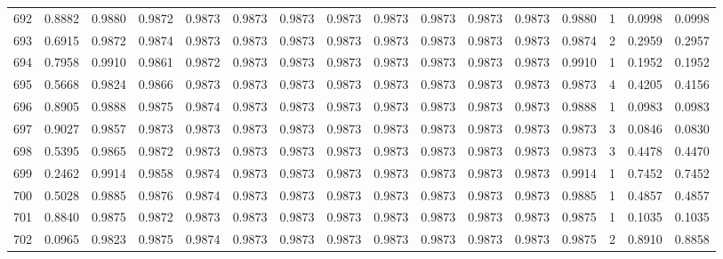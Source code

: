 \begin{tabular}{lrrrrrrrrrrrrrrr}
692 &      0.8882 &  0.9880 &  0.9872 &  0.9873 &  0.9873 &  0.9873 &  0.9873 &  0.9873 &  0.9873 &  0.9873 &   0.9873 &     0.9880 &      1 &                    0.0998 &                     0.0998 \\
693 &      0.6915 &  0.9872 &  0.9874 &  0.9873 &  0.9873 &  0.9873 &  0.9873 &  0.9873 &  0.9873 &  0.9873 &   0.9873 &     0.9874 &      2 &                    0.2959 &                     0.2957 \\
694 &      0.7958 &  0.9910 &  0.9861 &  0.9872 &  0.9873 &  0.9873 &  0.9873 &  0.9873 &  0.9873 &  0.9873 &   0.9873 &     0.9910 &      1 &                    0.1952 &                     0.1952 \\
695 &      0.5668 &  0.9824 &  0.9866 &  0.9873 &  0.9873 &  0.9873 &  0.9873 &  0.9873 &  0.9873 &  0.9873 &   0.9873 &     0.9873 &      4 &                    0.4205 &                     0.4156 \\
696 &      0.8905 &  0.9888 &  0.9875 &  0.9874 &  0.9873 &  0.9873 &  0.9873 &  0.9873 &  0.9873 &  0.9873 &   0.9873 &     0.9888 &      1 &                    0.0983 &                     0.0983 \\
697 &      0.9027 &  0.9857 &  0.9873 &  0.9873 &  0.9873 &  0.9873 &  0.9873 &  0.9873 &  0.9873 &  0.9873 &   0.9873 &     0.9873 &      3 &                    0.0846 &                     0.0830 \\
698 &      0.5395 &  0.9865 &  0.9872 &  0.9873 &  0.9873 &  0.9873 &  0.9873 &  0.9873 &  0.9873 &  0.9873 &   0.9873 &     0.9873 &      3 &                    0.4478 &                     0.4470 \\
699 &      0.2462 &  0.9914 &  0.9858 &  0.9874 &  0.9873 &  0.9873 &  0.9873 &  0.9873 &  0.9873 &  0.9873 &   0.9873 &     0.9914 &      1 &                    0.7452 &                     0.7452 \\
700 &      0.5028 &  0.9885 &  0.9876 &  0.9874 &  0.9873 &  0.9873 &  0.9873 &  0.9873 &  0.9873 &  0.9873 &   0.9873 &     0.9885 &      1 &                    0.4857 &                     0.4857 \\
701 &      0.8840 &  0.9875 &  0.9872 &  0.9873 &  0.9873 &  0.9873 &  0.9873 &  0.9873 &  0.9873 &  0.9873 &   0.9873 &     0.9875 &      1 &                    0.1035 &                     0.1035 \\
702 &      0.0965 &  0.9823 &  0.9875 &  0.9874 &  0.9873 &  0.9873 &  0.9873 &  0.9873 &  0.9873 &  0.9873 &   0.9873 &     0.9875 &      2 &                    0.8910 &                     0.8858 \\

\end{tabular}

